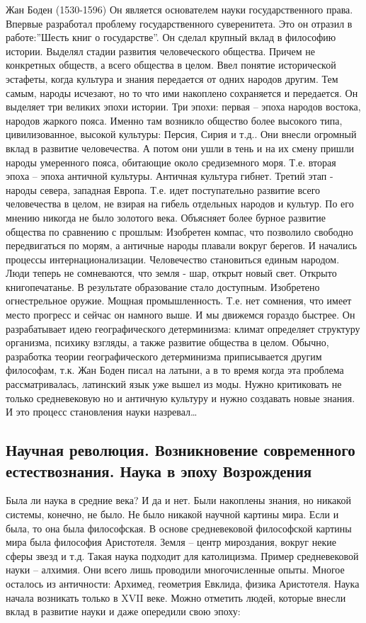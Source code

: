Жан Боден (1530-1596) Он является основателем науки государственного права. Впервые разработал проблему государственного суверенитета. Это он отразил в работе:”Шесть книг о государстве”. Он сделал крупный вклад в философию истории. Выделял стадии развития человеческого общества. Причем не конкретных обществ, а всего общества в целом. Ввел понятие исторической эстафеты, когда культура и знания передается от одних народов другим. Тем самым, народы исчезают, но то что ими накоплено сохраняется и передается. Он выделяет три великих эпохи истории. Три эпохи: первая – эпоха народов востока, народов жаркого пояса. Именно там возникло общество более высокого типа, цивилизованное, высокой культуры: Персия, Сирия и т.д.. Они внесли огромный вклад в развитие человечества. А потом они ушли в тень и на их смену пришли народы умеренного пояса, обитающие около средиземного моря. Т.е. вторая эпоха – эпоха античной культуры. Античная культура гибнет. Третий этап - народы севера, западная Европа. Т.е. идет поступательно развитие всего человечества в целом, не взирая на гибель отдельных народов и культур. По его мнению никогда не было золотого века. Объясняет более бурное развитие общества по сравнению с прошлым: Изобретен компас, что позволило свободно передвигаться по морям, а античные народы плавали вокруг берегов. И начались процессы интернационализации. Человечество становиться единым народом. Люди теперь не сомневаются, что земля - шар, открыт новый свет. Открыто книгопечатанье. В результате образование стало доступным. Изобретено огнестрельное оружие. Мощная промышленность. Т.е. нет сомнения, что имеет место прогресс и сейчас он намного выше. И мы движемся гораздо быстрее. Он разрабатывает идею географического детерминизма: климат определяет структуру организма, психику взгляды, а также развитие общества в целом. Обычно, разработка теории географического детерминизма приписывается другим философам, т.к. Жан Боден писал на латыни, а в то время когда эта проблема рассматривалась, латинский язык уже вышел из моды. Нужно критиковать не только средневековую но и античную культуру и нужно создавать новые знания. И это процесс становления науки назревал…
\subsection{Научная революция. Возникновение современного естествознания. Наука в эпоху Возрождения}

Была ли наука в средние века? И да и нет. Были накоплены знания, но никакой системы, конечно, не было. Не было никакой научной картины мира. Если и была, то она была философская. В основе средневековой философской картины мира была философия Аристотеля. Земля – центр мироздания, вокруг некие сферы звезд и т.д. Такая наука подходит для католицизма. Пример средневековой науки – алхимия. Они всего лишь проводили многочисленные опыты. Многое осталось из античности: Архимед, геометрия Евклида, физика Аристотеля. Наука начала возникать только в XVII веке. Можно отметить людей, которые внесли вклад в развитие науки и даже опередили свою эпоху:

